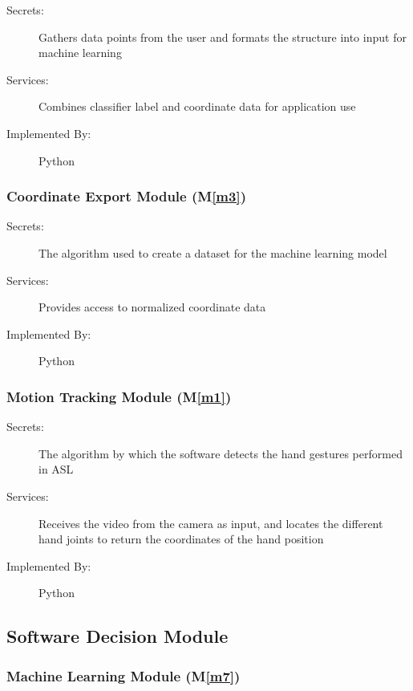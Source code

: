 \documentclass[12pt, titlepage]{article}
\newcommand{\mref}[1]{M\ref{#1}}
\begin{document}
\begin{description}
  \item[Secrets:] Gathers data points from the user and formats the structure into input for machine learning
  \item[Services:] Combines classifier label and coordinate data for application use
  \item[Implemented By:] Python
  \end{description}
  


\subsubsection{Coordinate Export Module (\mref{m3})}
\begin{description}
  \item[Secrets:] The algorithm used to create a dataset for the machine learning model
  \item[Services:] Provides access to normalized coordinate data
  \item[Implemented By:] Python
  \end{description}
  


\subsubsection{Motion Tracking Module (\mref{m1})}

\begin{description}
  \item[Secrets:] The algorithm by which the software detects the hand gestures performed in ASL
  \item[Services:] Receives the video from the camera as input, and locates the different hand joints to return the coordinates of the hand position
  \item[Implemented By:] Python
  \end{description}
  


\subsection{Software Decision Module}

\subsubsection{Machine Learning Module (\mref{m7})}
\end{document}
